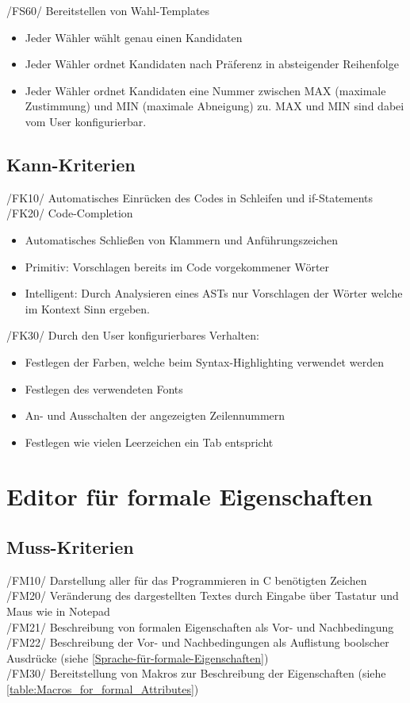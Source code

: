 \documentclass[a4paper]{scrreprt}
\begin{document}
/FS60/ Bereitstellen von Wahl-Templates
\begin{itemize}
\item Jeder Wähler wählt genau einen Kandidaten
\item Jeder Wähler ordnet Kandidaten nach Präferenz in absteigender Reihenfolge 
\item Jeder Wähler ordnet Kandidaten eine Nummer zwischen MAX (maximale Zustimmung) und MIN (maximale Abneigung) zu. MAX und MIN sind dabei vom User konfigurierbar. 
\end{itemize}

\subsection{Kann-Kriterien}
/FK10/ Automatisches Einrücken des Codes in Schleifen und if-Statements \\
/FK20/ Code-Completion
\begin{itemize}
\item Automatisches Schließen von Klammern und Anführungszeichen
\item Primitiv: Vorschlagen bereits im Code vorgekommener Wörter
\item Intelligent: Durch Analysieren eines ASTs nur Vorschlagen der Wörter welche im Kontext Sinn ergeben.
\end{itemize}

/FK30/ Durch den User konfigurierbares Verhalten:
\begin{itemize}
\item Festlegen der Farben, welche beim Syntax-Highlighting verwendet werden
\item Festlegen des verwendeten Fonts
\item An- und Ausschalten der angezeigten Zeilennummern
\item Festlegen wie vielen Leerzeichen ein Tab entspricht
\end{itemize}
 
\section{Editor für formale Eigenschaften}
\subsection{Muss-Kriterien}
/FM10/ Darstellung aller für das Programmieren in C benötigten Zeichen \\
/FM20/ Veränderung des dargestellten Textes durch Eingabe über Tastatur und Maus wie in Notepad \\
/FM21/ Beschreibung von formalen Eigenschaften als Vor- und Nachbedingung
/FM22/ Beschreibung der Vor- und Nachbedingungen als Auflistung boolscher Ausdrücke (siehe \ref{Sprache-für-formale-Eigenschaften})\\
/FM30/ Bereitstellung von Makros zur Beschreibung der Eigenschaften (siehe \ref{table:Macros_for_formal_Attributes}) \\
\end{document}
